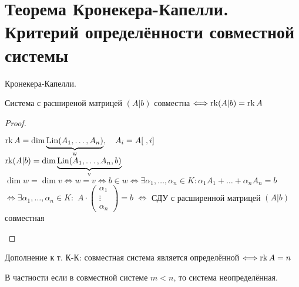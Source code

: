 
\section{Теорема Кронекера-Капелли. Критерий определённости совместной системы}

\begin{theorem}
    Кронекера-Капелли.

    Система с расширеной матрицей $(A|b)$ совместна
    $\Longleftrightarrow \operatorname{rk} (A|b) = \operatorname{rk} A$

    \begin{proof}
        \begin{center}
            $\operatorname{rk} A = \dim \underbrace{\operatorname{Lin}(A_1, \dots, A_n)}_{\text{w}}, \quad A_i = A[ \; , i]$ \\
            $\operatorname{rk} (A | b) = \dim \underbrace{\operatorname{Lin}(A_1, \dots, A_n, b)}_{\text{v}}$ \\
            $\dim w = \dim v \Longleftrightarrow w = v \Longleftrightarrow b \in w
            \Longleftrightarrow \exists \alpha_1, \dots, \alpha_n \in K:
            \alpha_1 A_1 + \dots + \alpha_n A_n = b$ \\
            $\Longleftrightarrow \exists \alpha_1, \dots, \alpha_n \in K:$ 
            $A \cdot \begin{pmatrix}
                \alpha_1 \\
                \vdots \\
                \alpha_n
            \end{pmatrix} = b$ $\Longleftrightarrow$ СДУ с расширенной матрицей $(A | b)$ совместная
        \end{center}    
    \end{proof}
\end{theorem}

\notice Дополнение к т. К-К: совместная система является определённой $\Longleftrightarrow \operatorname{rk} A = n$ 

В частности если в совместной системе $m < n$, то система неопределённая.